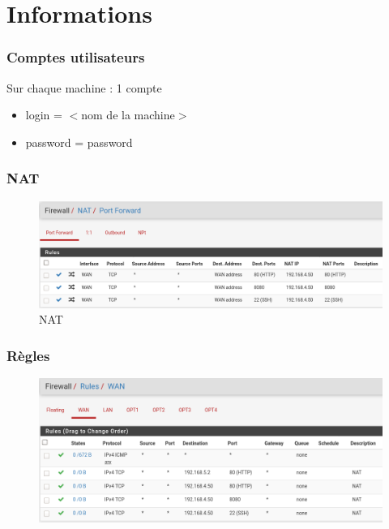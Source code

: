 \documentclass{beamer}
\begin{document}
		\section{Informations}
		\begin{frame}
			\frametitle{Comptes utilisateurs}
			\begin{block}{Sur chaque machine : 1 compte}
				\begin{itemize}
					\item login = $<$nom de la machine$>$
					\item password = password
				\end{itemize}
			\end{block}
		\end{frame}
		\begin{frame}
			\frametitle{NAT}
			\begin{center}
				\begin{figure}
					\includegraphics[scale=.3]{portforwading.png}
					\caption{NAT}
				\end{figure}
			\end{center}
		\end{frame}
		\begin{frame}
			\frametitle{Règles}
			\begin{center}
				\begin{figure}
					\includegraphics[scale=.3]{rules.png}
					\caption{}
				\end{figure}
			\end{center}
		\end{frame}
\end{document}

